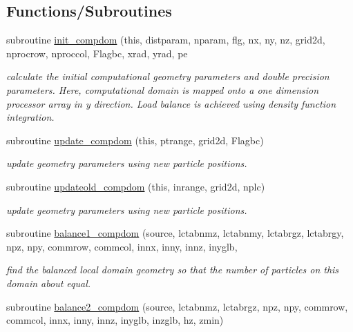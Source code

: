 \subsection*{Functions/\+Subroutines}
\begin{DoxyCompactItemize}
\item 
subroutine \mbox{\hyperlink{namespacecompdomclass_acdfdc48f4091ad70b76c1c7ed66c10b0}{init\+\_\+compdom}} (this, distparam, nparam, flg, nx, ny, nz, grid2d, nprocrow, nproccol, Flagbc, xrad, yrad, pe
\begin{DoxyCompactList}\small\item\em calculate the initial computational geometry parameters and double precision parameters. Here, computational domain is mapped onto a one dimension processor array in y direction. Load balance is achieved using density function integration. \end{DoxyCompactList}\item 
subroutine \mbox{\hyperlink{namespacecompdomclass_a0e7d562b378f77e0d3a14b33168cb46b}{update\+\_\+compdom}} (this, ptrange, grid2d, Flagbc)
\begin{DoxyCompactList}\small\item\em update geometry parameters using new particle positions. \end{DoxyCompactList}\item 
subroutine \mbox{\hyperlink{namespacecompdomclass_abf3eab7526c06e30b574ddf8be378826}{updateold\+\_\+compdom}} (this, inrange, grid2d, nplc)
\begin{DoxyCompactList}\small\item\em update geometry parameters using new particle positions. \end{DoxyCompactList}\item 
subroutine \mbox{\hyperlink{namespacecompdomclass_aab3fa2d18dbc8bc4d825e36304c4b4d8}{balance1\+\_\+compdom}} (source, lctabnmz, lctabnmy, lctabrgz, lctabrgy, npz, npy, commrow, commcol, innx, inny, innz, inyglb,
\begin{DoxyCompactList}\small\item\em find the balanced local domain geometry so that the number of particles on this domain about equal. \end{DoxyCompactList}\item 
subroutine \mbox{\hyperlink{namespacecompdomclass_a6d30ed07486cc6d7f9bf0e87f948e807}{balance2\+\_\+compdom}} (source, lctabnmz, lctabrgz, npz, npy, commrow, commcol, innx, inny, innz, inyglb, inzglb, hz, zmin)
\item 

\end{DoxyCompactItemize}
